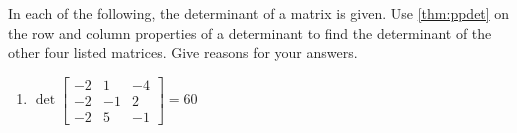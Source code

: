 \begin{exercise} \label{ex:} 
In each of the following, the determinant of a matrix is given. 
Use \autoref{thm:ppdet} on the row and column properties of a determinant to find the determinant of the other four listed matrices.
Give reasons for your answers.
\begin{enumerate}
\item \(\det\begin{bmatrix} -2 & 1 & -4
\\-2 & -1 & 2
\\-2 & 5 & -1 \end{bmatrix}=60\)



\end{enumerate}
\end{exercise}
